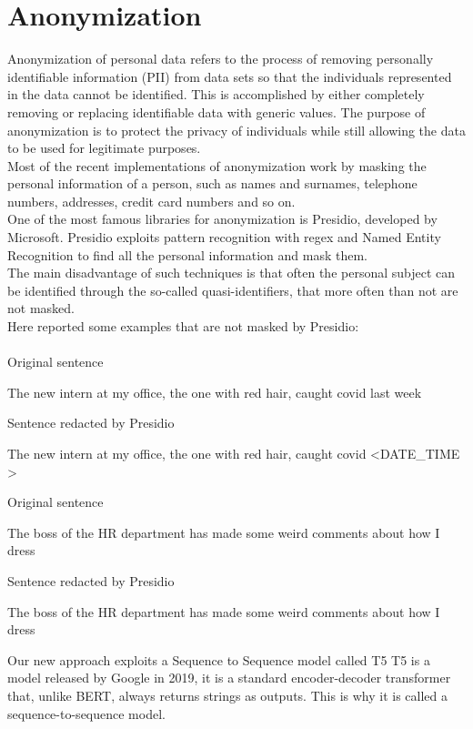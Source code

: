 \section{Anonymization}

Anonymization of personal data refers to the process of removing personally identifiable information (PII) from data sets so that the individuals represented in the data cannot be identified. This is accomplished by either completely removing or replacing identifiable data with generic values. The purpose of anonymization is to protect the privacy of individuals while still allowing the data to be used for legitimate purposes. \\
Most of the recent implementations of anonymization work by masking the personal information of a person, such as names and surnames, telephone numbers, addresses, credit card numbers and so on. \\
One of the most famous libraries for anonymization is Presidio, developed by Microsoft. Presidio exploits pattern recognition with regex and Named Entity Recognition to find all the personal information and mask them. \\
The main disadvantage of such techniques is that often the personal subject can be identified through the so-called quasi-identifiers, that more often than not are not masked.
\\Here reported some examples that are not masked by Presidio:\\ \\
Original sentence
\begin{adjustwidth}{1cm}{}
    The new intern at my office, the one with red hair, caught covid last week 
\end{adjustwidth}
Sentence redacted by Presidio
\begin{adjustwidth}{1cm}{}
    The new intern at my office, the one with red hair, caught covid \textless DATE\_TIME \textgreater
\end{adjustwidth}
Original sentence
\begin{adjustwidth}{1cm}{}
    The boss of the HR department has made some weird comments about how I dress
\end{adjustwidth}
Sentence redacted by Presidio
\begin{adjustwidth}{1cm}{}
    The boss of the HR department has made some weird comments about how I dress 
\end{adjustwidth}
Our new approach exploits a Sequence to Sequence model called T5
T5 is a model released by Google in 2019, it is a standard encoder-decoder transformer that, unlike BERT, always returns strings as outputs. This is why it is called a sequence-to-sequence model. \\
